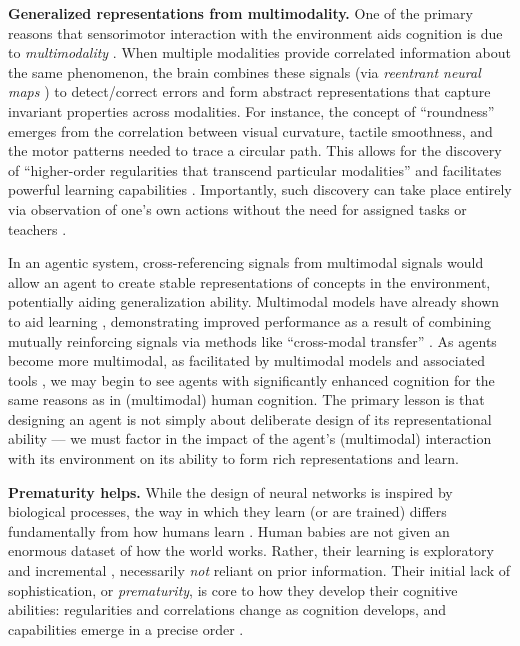 \documentclass{article}
\theoremstyle{plain}
\theoremstyle{definition}
\theoremstyle{remark}
\begin{document}
{\bf Generalized representations from multimodality.} One of the primary reasons that sensorimotor interaction with the environment aids cognition is due to \emph{multimodality} \cite{smith2005development}. When multiple modalities provide correlated information about the same phenomenon, the brain combines these signals (via \emph{reentrant neural maps} \cite{edelman1987neural}) to detect/correct errors and form abstract representations that capture invariant properties across modalities. 
For instance, the concept of ``roundness'' emerges from the correlation between visual curvature, tactile smoothness, and the motor patterns needed to trace a circular path. This allows for the discovery of ``higher-order regularities that transcend particular modalities'' and facilitates powerful learning capabilities \cite{smith2005development}. Importantly, such discovery can take place entirely via observation of one's own actions without the need for assigned tasks or teachers \cite{piaget1952origins,bushnell2013dual}.

In an agentic system, cross-referencing signals from multimodal signals would allow an agent to create stable representations of concepts in the environment, potentially aiding generalization ability. Multimodal models have already shown to aid learning \cite{huang2023embodied,li2025semgrasp}, demonstrating improved performance as a result of combining mutually reinforcing signals via methods like ``cross-modal transfer'' \cite{huang2023language}. As agents become more multimodal, as facilitated by multimodal models and associated tools  \cite{alayrac2022flamingo,sun2023generative,zhang2024mm}, we may begin to see agents with significantly enhanced cognition for the same reasons as in (multimodal) human cognition. The primary lesson is that designing an agent is not simply about deliberate design of its representational ability --- we must factor in the impact of the agent's (multimodal) interaction with its environment on its ability to form rich representations and learn.



{\bf Prematurity helps.} While the design of neural networks is inspired by biological processes, the way in which they learn (or are trained) differs fundamentally from how humans learn \cite{lake2017building}. Human babies are not given an enormous dataset of how the world works. Rather, their learning is exploratory and incremental \cite{gopnik1999scientist,gopnik2020childhood}, necessarily \emph{not} reliant on prior information. Their initial lack of sophistication, or \emph{prematurity}, is core to how they develop their cognitive abilities: regularities and correlations change as cognition develops, and capabilities emerge in a precise order \cite{smith2005development}. 
\end{document}
